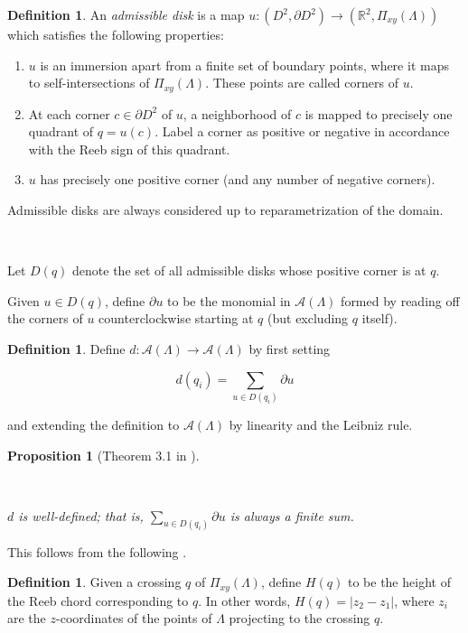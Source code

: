 \documentclass[a4paper,final, reqno]{amsart}
\theoremstyle{plain}
\newtheorem{Prop}[Th]{Proposition}
\theoremstyle{definition}
\newtheorem{Def}[Th]{Definition}
\newcommand{\A}{\mathcal{A}}
\begin{document}
	\begin{Def}\label{def:admdisk1}
		An \emph{admissible disk} is a map $u: (D^2, \partial D^2) \to (\mathbb{R}^2, \Pi_{xy}(\Lambda))$ which satisfies the following properties:
		
		\begin{enumerate}
			\item $u$ is an immersion apart from a finite set of boundary points, where it maps to self-intersections of $\Pi_{xy}(\Lambda)$. These points are called corners of $u$.
			\item At each corner $c \in \partial D^2$ of $u$, a neighborhood of $c$ is mapped to precisely one quadrant of $q = u(c)$. Label a corner as positive or negative in accordance with the Reeb sign of this quadrant.
			\item $u$ has precisely one positive corner (and any number of negative corners).
		\end{enumerate}
		
		Admissible disks are always considered up to reparametrization of the domain.
		
		\-\
		
		Let $D(q)$ denote the set of all admissible disks whose positive corner is at $q$. 
		
		Given $u \in D(q)$, define $\partial u$ to be the monomial in $\A(\Lambda)$ formed by reading off the corners of $u$ counterclockwise starting at $q$ (but excluding $q$ itself).	
	\end{Def}
	
	\begin{Def}\label{def:cediff}
		Define $d: \A(\Lambda) \to \A(\Lambda)$ by first setting 
		
		\[ d(q_i) = \sum_{u\in D(q_i)} \partial u \]
		
		and extending the definition to $\A(\Lambda)$ by linearity and the Leibniz rule. 
	\end{Def}
	
	
	
	
	\begin{Prop}[Theorem 3.1 in \cite{Chekanov}]\label{prop:cediffwell}
		
		\-\
		
		$d$ is well-defined; that is, $\sum_{u\in D(q_i)} \partial u$ is always a finite sum.
	\end{Prop}
	
	This follows from the following .
	
	\begin{Def}
		Given a crossing $q$ of $\Pi_{xy}(\Lambda)$, define $H(q)$ to be the height of the Reeb chord corresponding to $q$. In other words, $H(q) = |z_2-z_1|$, where $z_i$ are the $z$-coordinates of the points of $\Lambda$ projecting to the crossing $q$.
	\end{Def}
	
\end{document}
